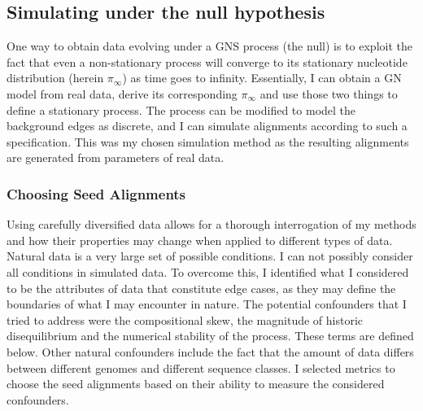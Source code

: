 

\subsection{Simulating under the null hypothesis}
\label{Simulating under the null}

One way to obtain data evolving under a GNS process (the null) is to exploit the fact that even a non-stationary process will converge to its stationary nucleotide distribution (herein $\pi_{\infty}$) as time goes to infinity. Essentially, I can obtain a GN model from real data, derive its corresponding $\pi_{\infty}$ and use those two things to define a stationary process. The process can be modified to model the background edges as discrete, and I can simulate alignments according to such a specification. This was my chosen simulation method as the resulting alignments are generated from parameters of real data. 

\subsubsection{Choosing Seed Alignments}

Using carefully diversified data allows for a thorough interrogation of my methods and how their properties may change when applied to different types of data. Natural data is a very large set of possible conditions. I can not possibly consider all conditions in simulated data. To overcome this, I identified what I considered to be the attributes of data that constitute edge cases, as they may define the boundaries of what I may encounter in nature. The potential confounders that I tried to address were the compositional skew, the magnitude of historic disequilibrium and the numerical stability of the process. These terms are defined below. Other natural confounders include the fact that the amount of data differs between different genomes and different sequence classes. I selected metrics to choose the seed alignments based on their ability to measure the considered confounders. 


